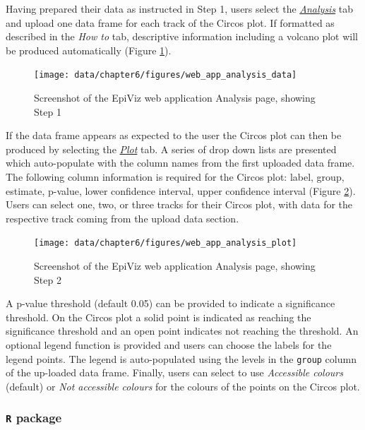 \documentclass[11pt,twoside]{bristolthesis}
\begin{document}
Having prepared their data as instructed in Step 1, users select the \href{}{\emph{Analysis}} tab and upload one data frame for each track of the Circos plot. If formatted as described in the \emph{How to} tab, descriptive information including a volcano plot will be produced automatically (Figure \ref{fig:web-app-analysis-step1}).
\begin{figure}
\texttt{[image: data/chapter6/figures/web\_app\_analysis\_data]} \caption{Screenshot of the EpiViz web application Analysis page, showing Step 1}\label{fig:web-app-analysis-step1}
\end{figure}
If the data frame appears as expected to the user the Circos plot can then be produced by selecting the \href{}{\emph{Plot}} tab. A series of drop down lists are presented which auto-populate with the column names from the first uploaded data frame. The following column information is required for the Circos plot: label, group, estimate, p-value, lower confidence interval, upper confidence interval (Figure \ref{fig:web-app-analysis-step2}). Users can select one, two, or three tracks for their Circos plot, with data for the respective track coming from the upload data section.
\begin{figure}
\texttt{[image: data/chapter6/figures/web\_app\_analysis\_plot]} \caption{Screenshot of the EpiViz web application Analysis page, showing Step 2}\label{fig:web-app-analysis-step2}
\end{figure}
A p-value threshold (default 0.05) can be provided to indicate a significance threshold. On the Circos plot a solid point is indicated as reaching the significance threshold and an open point indicates not reaching the threshold. An optional legend function is provided and users can choose the labels for the legend points. The legend is auto-populated using the levels in the \texttt{group} column of the up-loaded data frame. Finally, users can select to use \emph{Accessible colours} (default) or \emph{Not accessible colours} for the colours of the points on the Circos plot.

\hypertarget{r-package}{%
\subsubsection{\texorpdfstring{\texttt{R} package}{R package}}\label{r-package}}
\end{document}
